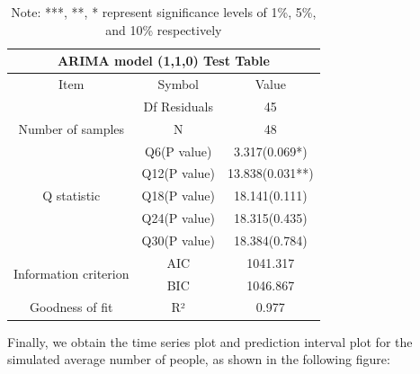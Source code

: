\documentclass[12pt]{article}  %
\begin{document}
\begin{table}[]
\centering
\begin{tabular}{|ccc|}
\hline
\multicolumn{3}{|c|}{ARIMA   model (1,1,0) Test Table}                                          \\ \hline
\multicolumn{1}{|c|}{Item}              & \multicolumn{1}{c|}{Symbol}         & Value           \\ \hline
\multicolumn{1}{|c|}{}                  & \multicolumn{1}{c|}{Df   Residuals} & 45              \\ \hline
\multicolumn{1}{|c|}{Number of samples} & \multicolumn{1}{c|}{N}              & 48              \\ \hline
\multicolumn{1}{|c|}{\multirow{5}{*}{Q statistic}}           & \multicolumn{1}{c|}{Q6(P   value)} & 3.317(0.069*) \\ \cline{2-3} 
\multicolumn{1}{|c|}{}                  & \multicolumn{1}{c|}{Q12(P value)}   & 13.838(0.031**) \\ \cline{2-3} 
\multicolumn{1}{|c|}{}                  & \multicolumn{1}{c|}{Q18(P value)}   & 18.141(0.111)   \\ \cline{2-3} 
\multicolumn{1}{|c|}{}                  & \multicolumn{1}{c|}{Q24(P value)}   & 18.315(0.435)   \\ \cline{2-3} 
\multicolumn{1}{|c|}{}                  & \multicolumn{1}{c|}{Q30(P value)}   & 18.384(0.784)   \\ \hline
\multicolumn{1}{|c|}{\multirow{2}{*}{Information criterion}} & \multicolumn{1}{c|}{AIC}           & 1041.317      \\ \cline{2-3} 
\multicolumn{1}{|c|}{}                  & \multicolumn{1}{c|}{BIC}            & 1046.867        \\ \hline
\multicolumn{1}{|c|}{Goodness of fit}   & \multicolumn{1}{c|}{R²}             & 0.977           \\ \hline
\end{tabular}
\caption{Note: ***, **, * represent significance levels of 1\%, 5\%, and 10\% respectively}
\end{table}



Finally, we obtain the time series plot and prediction interval plot for the simulated average number of people, as shown in the following figure:
\end{document}
